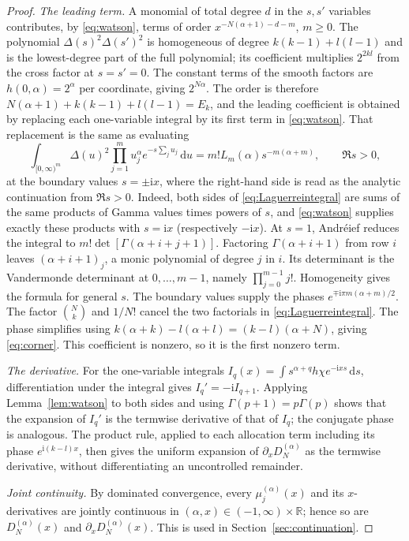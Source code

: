 \documentclass[11pt]{article}
\numberwithin{equation}{section}
\theoremstyle{remark}
\newcommand{\ii}{\mathrm{i}}
\newcommand{\dd}{\,\mathrm{d}}
\newcommand{\R}{\mathbb{R}}
\begin{document}
\begin{proof}
\emph{The leading term.} A monomial of total degree $d$ in the
$s,s'$ variables contributes, by \eqref{eq:watson}, terms of order
$x^{-N(\alpha+1)-d-m}$, $m\ge0$. The polynomial
$\Delta(s)^2\Delta(s')^2$ is homogeneous of degree
$k(k-1)+l(l-1)$ and is the lowest-degree part of the full polynomial;
its coefficient multiplies $2^{2kl}$ from the cross factor at
$s=s'=0$. The constant terms of the smooth factors are
$h(0,\alpha)=2^\alpha$ per coordinate, giving $2^{N\alpha}$. The order is
therefore $N(\alpha+1)+k(k-1)+l(l-1)=E_k$, and the leading
coefficient is obtained by replacing each one-variable integral by its
first term in \eqref{eq:watson}. That replacement is the same as
evaluating
\begin{equation}\label{eq:Laguerreintegral}
 \int_{[0,\infty)^m}\Delta(u)^2\prod_{j=1}^m u_j^\alpha
                 e^{-s\sum_j u_j}\dd u
 =m!L_m(\alpha)s^{-m(\alpha+m)},\qquad \Re s>0,
\end{equation}
at the boundary values $s=\pm\ii x$, where the right-hand side is read
as the analytic continuation from $\Re s>0$. Indeed, both sides of
\eqref{eq:Laguerreintegral} are sums of the same products of Gamma
values times powers of $s$, and \eqref{eq:watson} supplies exactly these
products with $s=\ii x$ (respectively $-\ii x$). At $s=1$, Andr\'eief
reduces the integral to $m!\det[\Gamma(\alpha+i+j+1)]$. Factoring
$\Gamma(\alpha+i+1)$ from row $i$ leaves $(\alpha+i+1)_j$, a monic
polynomial of degree $j$ in $i$. Its determinant is the Vandermonde
determinant at $0,\ldots,m-1$, namely $\prod_{j=0}^{m-1}j!$. Homogeneity
gives the formula for general $s$. The boundary values supply the
phases $e^{\mp\ii\pi m(\alpha+m)/2}$. The factor $\binom Nk$ and $1/N!$
cancel the two factorials in \eqref{eq:Laguerreintegral}. The phase
simplifies using $k(\alpha+k)-l(\alpha+l)=(k-l)(\alpha+N)$, giving
\eqref{eq:corner}. This coefficient is nonzero, so it is the first
nonzero term.

\emph{The derivative.} For the one-variable integrals
$I_q(x)=\int s^{\alpha+q}h\chi e^{-\ii xs}\dd s$, differentiation under the
integral gives $I_q'=-\ii I_{q+1}$. Applying Lemma~\ref{lem:watson} to
both sides and using $\Gamma(p+1)=p\Gamma(p)$ shows that the expansion of
$I_q'$ is the termwise derivative of that of $I_q$; the conjugate phase
is analogous. The product rule, applied to each allocation term
including its phase $e^{\ii(k-l)x}$, then gives the uniform expansion of
$\partial_xD_N^{(\alpha)}$ as the termwise derivative, without
differentiating an uncontrolled remainder.

\emph{Joint continuity.} By dominated convergence, every
$\mu_j^{(\alpha)}(x)$ and its $x$-derivatives are jointly continuous in
$(\alpha,x)\in(-1,\infty)\times\R$; hence so are $D_N^{(\alpha)}(x)$ and
$\partial_xD_N^{(\alpha)}(x)$. This is used in Section~\ref{sec:continuation}.
\end{proof}
\end{document}
